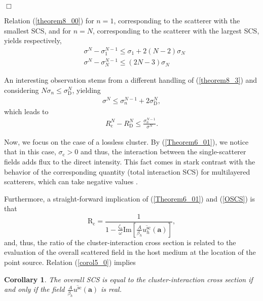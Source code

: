 \documentclass{article}
\newtheorem{corollary}{Corollary}
\begin{document}
%
 \begin{flushright}$\Box$\end{flushright}
%
Relation (\ref{theorem8_00}) for $n=1$, corresponding to the scatterer with the smallest SCS, and for $n=N$, corresponding to the scatterer with the largest SCS, yields respectively,
%
\begin{align}
        \label{theorem8_01}
        &\sigma^{N}-\sigma_1^{N-1}\leq \sigma_1+2(N-2)\sigma_N\\
        \label{theorem8_02}
        &\sigma^{N}-\sigma_N^{N-1}\leq (2N-3)\sigma_N
\end{align}
%

An interesting observation stems from a different handling of (\ref{theorem8_3}) and considering $N\sigma_n\leq\sigma_{\mathrm{D}}^{N}$, yielding
%
\begin{align}
\label{theorem8_4}
\sigma^{N}\leq
\sigma_n^{N-1}+2\sigma_{\mathrm{D}}^{N},
\end{align}
%
which leads to
%
\begin{align}
\label{theorem8_5}
R_{\mathrm{c}}^{N}-R_{\mathrm{D}}^{N}\leq
\frac{\sigma_n^{N-1}}{\sigma^{N}}.
\end{align}
%
 
Now, we focus on the case of a lossless cluster. By (\ref{Theorem6_01}), we notice that in this case, $\sigma_\mathrm{c}>0$ and thus, the interaction between the single-scatterer fields adds flux to the direct intensity. This fact comes in stark contrast with the behavior of the corresponding quantity (total interaction SCS) for multilayered scatterers, which can take negative values \cite{SAPM,QAM1,OJAP}. 

Furthermore, a straight-forward implication of (\ref{Theorem6_01}) and (\ref{OSCS}) is that
%
\begin{equation}\label{corol5_0}
    \mathrm{R}_{\mathrm{c}}=\frac{1}{1-\frac{\zeta_h}{\omega}\mathrm{Im}\left[\frac{A}{\beta_h}\overline{u_h^{\mathrm{sc}}}(\mathbf{a})\right]},
\end{equation}
%
and, thus, the ratio of the cluster-interaction cross section is related to the evaluation of the overall scattered field in the host medium at the location of the point source. Relation (\ref{corol5_0}) implies
%
\begin{corollary}
    The overall SCS is equal to the cluster-interaction cross section if and only if the field $\frac{A}{\beta_h}\overline{u^{\mathrm{sc}}}(\mathbf{a})$ is real. 
\end{corollary}
\end{document}
